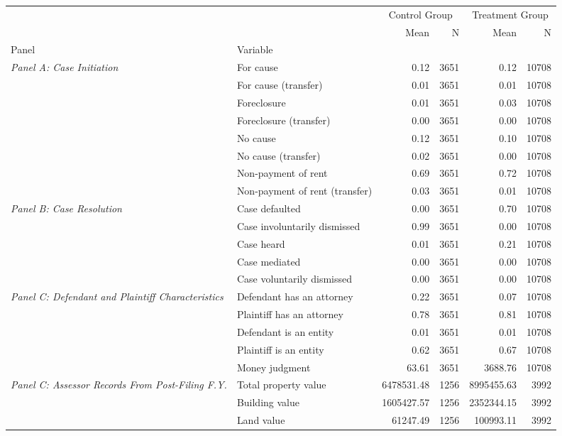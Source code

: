 \begin{tabular}{llrrrr}
\toprule
 &  & \multicolumn{2}{c}{Control Group} & \multicolumn{2}{c}{Treatment Group} \\
 &  & Mean & N & Mean & N \\
Panel & Variable &  &  &  &  \\
\midrule
\multirow[c]{8}{4cm}{\textit{Panel A: Case Initiation}} & For cause & 0.12 & 3651 & 0.12 & 10708 \\
 & For cause (transfer) & 0.01 & 3651 & 0.01 & 10708 \\
 & Foreclosure & 0.01 & 3651 & 0.03 & 10708 \\
 & Foreclosure (transfer) & 0.00 & 3651 & 0.00 & 10708 \\
 & No cause & 0.12 & 3651 & 0.10 & 10708 \\
 & No cause (transfer) & 0.02 & 3651 & 0.00 & 10708 \\
 & Non-payment of rent & 0.69 & 3651 & 0.72 & 10708 \\
 & Non-payment of rent (transfer) & 0.03 & 3651 & 0.01 & 10708 \\
\cline{1-6}
\multirow[c]{5}{4cm}{\textit{Panel B: Case Resolution}} & Case defaulted & 0.00 & 3651 & 0.70 & 10708 \\
 & Case involuntarily dismissed & 0.99 & 3651 & 0.00 & 10708 \\
 & Case heard & 0.01 & 3651 & 0.21 & 10708 \\
 & Case mediated & 0.00 & 3651 & 0.00 & 10708 \\
 & Case voluntarily dismissed & 0.00 & 3651 & 0.00 & 10708 \\
\cline{1-6}
\multirow[c]{5}{4cm}{\textit{Panel C: Defendant and Plaintiff Characteristics}} & Defendant has an attorney & 0.22 & 3651 & 0.07 & 10708 \\
 & Plaintiff has an attorney & 0.78 & 3651 & 0.81 & 10708 \\
 & Defendant is an entity & 0.01 & 3651 & 0.01 & 10708 \\
 & Plaintiff is an entity & 0.62 & 3651 & 0.67 & 10708 \\
 & Money judgment & 63.61 & 3651 & 3688.76 & 10708 \\
\cline{1-6}
\multirow[c]{5}{4cm}{\textit{Panel C: Assessor Records From Post-Filing F.Y.}} & Total property value & 6478531.48 & 1256 & 8995455.63 & 3992 \\
 & Building value & 1605427.57 & 1256 & 2352344.15 & 3992 \\
 & Land value & 61247.49 & 1256 & 100993.11 & 3992 \\

\end{tabular}
